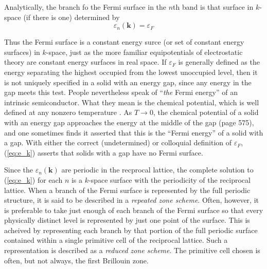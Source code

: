 	Analytically, the branch fo the Fermi surface in the $n$th band is that surface in $k$-space (if there is one) determined by
	\begin{equation} \label{eq:e_k}
		\varepsilon_n(\mathbf{k}) = \varepsilon_F
	\end{equation}

	Thus the Fermi surface is a constant energy surce (or set of constant energy surfaces)  in $k$-space, just as the more familiar equipotentials of electrostatic theory are constant energy surfaces in real space.
	If $\varepsilon_F$ is generally defined as the energy separating the highest occupied from the lowest unoccupied level, then it is not uniquely specified in a solid with an energy gap, since any energy in the gap meets this test. People nevertheless speak of ``\emph{the} Fermi energy'' of an intrinsic semiconductor. What they mean is the chemical potential, which is well defined at any nonzero temperature . As $T\rightarrow 0$, the chemical potential of a solid with an energy gap approaches the energy at the middle of the gap (page 575), and one sometimes finds it asserted that this is the ``Fermi energy'' of a solid with a gap. With either the correct (undetermined) or colloquial definition of $\varepsilon_F$, (\ref{eq:e_k}) asserts that solids with a gap have no Fermi surface.

	Since the $\varepsilon_n(\mathbf{k})$ are periodic in the recprocal lattice, the complete solution to (\ref{eq:e_k}) for each $n$ is a $k$-space surface with the periodicity of the reciprocal lattice. When a branch of the Fermi surface is represented by the full periodic structure, it is said to be described in a \emph{repeated zone scheme}. Often, however, it is preferable to take just enough of each branch of the Fermi surface so that every physically distinct level is represented by just one point of the surface. This is acheived by representing each branch by that portion of the full periodic surface contained within a single primitive cell of the reciprocal lattice. Such a representation is described as a \emph{reduced zone scheme}. The primitive cell chosen is often, but not always, the first Brillouin zone. 
